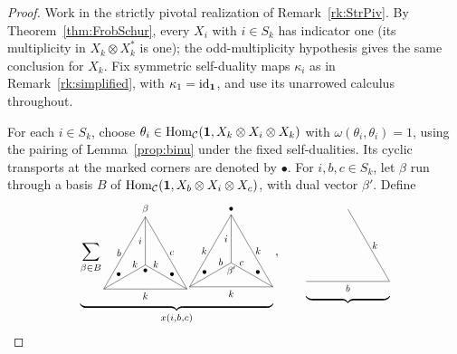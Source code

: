\documentclass{amsart}
\begin{document}
\begin{proof}
Work in the strictly pivotal realization of Remark~\ref{rk:StrPiv}.
By Theorem~\ref{thm:FrobSchur}, every $X_i$ with $i\in S_k$ has
indicator one (its multiplicity in $X_k\otimes X_k^*$ is one);
the odd-multiplicity hypothesis gives the same conclusion for $X_k$.
Fix symmetric self-duality maps $\kappa_i$ as in Remark~\ref{rk:simplified},
with $\kappa_1=\mathrm{id}_{{\bf 1}}$, and use its unarrowed calculus throughout.

For each $i\in S_k$, choose
$\theta_i\in\mathrm{Hom}_{\mathcal{C}}({\bf 1},X_k\otimes X_i\otimes X_k)$ with
$\omega(\theta_i,\theta_i)=1$, using the pairing of
Lemma~\ref{prop:binu} under the fixed self-dualities. Its cyclic transports
at the marked corners are denoted by $\bullet$. For $i,b,c\in S_k$, let $\beta$
run through a basis $B$ of $\mathrm{Hom}_{\mathcal{C}}({\bf 1},X_b\otimes X_i\otimes X_c)$,
with dual vector $\beta'$. Define
\[
\underbrace{\sum_{\beta\in B}\vcenter{\hbox{\scalebox{.77}{\begin{tikzpicture}[scale=1.5]
\draw (0,0)  -- (1,0) node [below] {$k$}; \draw (1,0) -- (2,0);
\draw (2,0) -- (1.5,.866) node [right] {$c$}; \draw (1.5,.866) -- (1,1.732);
\draw (1,1.732) node [above] {$\beta$} -- (.5,.866) node [left] {$b$}; \draw (.5,.866) -- (0,0);
\draw (0,0) -- (.75,.433) node [above] {$k$}; \draw (.75,.433) -- (1,0.577);
\draw (1,0.577) node [below] {$\bullet$} -- (1,1.1545) node [left] {$i$}; \draw (1,1.1545) -- (1,1.732);
\draw (1,0.577) -- (1.25,.433) node [above] {$k$}; \draw (1.25,.433) -- (2,0);
\node at (.36,.35) {$\bullet$};
\node at (2-.36,.35) {$\bullet$};
\end{tikzpicture}}}}\,\vcenter{\hbox{\scalebox{.77}{\begin{tikzpicture}[scale=1.5]
\draw (0,0) -- (1,0) node [below] {$k$}; \draw (1,0) -- (2,0);
\draw (2,0) -- (1.5,.866) node [right] {$k$}; \draw (1.5,.866) -- (1,1.732);
\draw (1,1.732) node [above] {$\bullet$} -- (.5,.866) node [left] {$k$}; \draw (.5,.866) -- (0,0);
\draw (0,0) -- (.75,.433) node [above] {$b$}; \draw (.75,.433) -- (1,0.577);
\draw (1,0.577) node [below] {$\beta'$} -- (1,1.1545) node [left] {$i$}; \draw (1,1.1545) -- (1,1.732);
\draw (1,0.577) -- (1.25,.433) node [above] {$c$}; \draw (1.25,.433) -- (2,0);
\node at (.36,.35) {$\bullet$};
\node at (2-.36,.35) {$\bullet$};
\end{tikzpicture}}}}}_{x(i,b,c)}\,,\qquad\underbrace{\vcenter{\hbox{\scalebox{.77}{\begin{tikzpicture}[scale=1.5]
\draw (0,0) -- (1,0) node [below] {$b$}; \draw (1,0) -- (2,0);
\draw (2,0) -- (1.5,.866) node [right] {$k$}; \draw (1.5,.866) -- (1,1.732);

\end{tikzpicture}}}}}\]
\end{proof}
\end{document}
